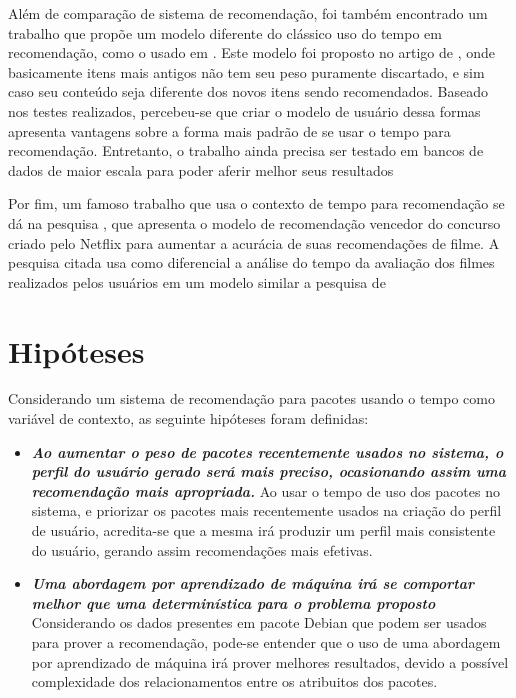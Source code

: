 Além de comparação de sistema de recomendação, foi também encontrado um trabalho que propõe um modelo diferente do clássico uso do tempo em recomendação, como o usado em
\cite{ding2005time}. Este modelo foi proposto no artigo de \cite{basile2015modeling}, onde basicamente itens mais antigos não tem seu peso puramente discartado, e sim caso
seu conteúdo seja diferente dos novos itens sendo recomendados. Baseado nos testes realizados, percebeu-se que criar o modelo de usuário dessa formas apresenta vantagens sobre
a forma mais padrão de se usar o tempo para recomendação. Entretanto, o trabalho ainda precisa ser testado em bancos de dados de maior escala para poder aferir melhor seus
resultados

Por fim, um famoso trabalho que usa o contexto de tempo para recomendação se dá na pesquisa \cite{koren2010collaborative}, que apresenta o modelo de recomendação vencedor
do concurso criado pelo Netflix para aumentar a acurácia de suas recomendações de filme. A pesquisa citada usa como diferencial a análise do tempo da avaliação dos filmes
realizados pelos usuários em um modelo similar a pesquisa de \cite{basile2015modeling}
    

\section{Hipóteses}

Considerando um sistema de recomendação para pacotes usando o tempo como variável de contexto, as seguinte hipóteses foram definidas:

\begin{itemize} \item \textit{\textbf{Ao aumentar o peso de pacotes
recentemente usados no sistema, o perfil do usuário gerado será mais preciso,
ocasionando assim uma recomendação mais apropriada.}} Ao usar o tempo de uso dos
pacotes no sistema, e priorizar os pacotes mais recentemente usados na criação
do perfil de usuário, acredita-se que a mesma irá produzir um perfil mais
consistente do usuário, gerando assim recomendações mais efetivas.\item
\textit{\textbf{Uma abordagem por aprendizado de máquina irá se comportar melhor
        que uma determinística para o problema proposto}} 
Considerando os dados presentes em pacote Debian que podem ser
usados para prover a recomendação, pode-se entender que o uso de uma abordagem
por aprendizado de máquina irá prover melhores resultados, devido a possível
complexidade dos relacionamentos entre os atribuitos dos pacotes.
\end{itemize}

